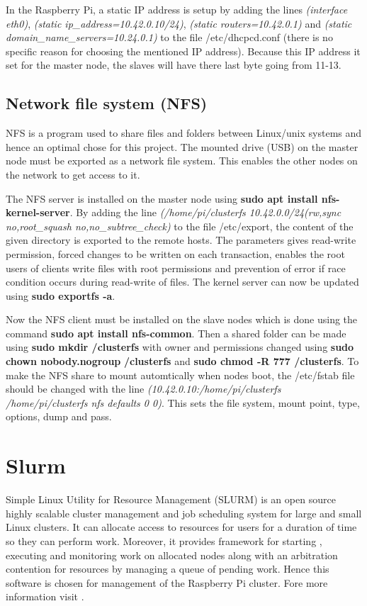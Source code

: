 \documentclass[../Head/Report.tex]{subfiles}
\begin{document}
In the Raspberry Pi, a static IP address is setup by adding the lines \textit{(interface eth0)}, \textit{(static ip\_address=10.42.0.10/24)}, \textit{(static routers=10.42.0.1)} and \textit{(static domain\_name\_servers=10.24.0.1)} to the file /etc/dhcpcd.conf (there is no specific reason for choosing the mentioned IP address). Because this IP address it set for the master node, the slaves will have there last byte going from 11-13.

\subsection{Network file system (NFS)} 

NFS is a program used to share files and folders between Linux/unix systems and hence an optimal chose for this project. The mounted drive (USB) on the master node must be exported as a network file system. This enables the other nodes on the network to get access to it. 

The NFS server is installed on the master node using \textbf{sudo apt install nfs-kernel-server}. By adding the line \textit{(/home/pi/clusterfs 10.42.0.0/24(rw,sync no,root\_squash no,no\_subtree\_check)} to the file /etc/export, the content of the given directory is exported to the remote hosts. The parameters gives read-write permission, forced changes to be written on each transaction, enables the root users of clients write files with root permissions and prevention of error if race condition occurs during read-write of files. The kernel server can now be updated using \textbf{sudo exportfs -a}. 

Now the NFS client must be installed on the slave nodes which is done using the command \textbf{sudo apt install nfs-common}. Then a shared folder can be made using \textbf{sudo mkdir /clusterfs} with owner and permissions changed using \textbf{sudo chown nobody.nogroup} \textbf{/clusterfs} and \textbf{sudo chmod -R 777 /clusterfs}. To make the NFS share to mount automtically when nodes boot, the /etc/fstab file should be changed with the line \textit{(10.42.0.10:/home/pi/clusterfs /home/pi/clusterfs nfs defaults 0 0)}. This sets the file system, mount point, type, options, dump and pass. \cite{NFS}

\section{Slurm}

Simple Linux Utility for Resource Management (SLURM) is an open source highly scalable cluster management and job scheduling system for large and small Linux clusters. It can allocate access to resources for users for a duration of time so they can perform work. Moreover, it provides framework for starting , executing and monitoring work on allocated nodes along with an arbitration contention for resources by managing a queue of pending work. Hence this software is chosen for management of the Raspberry Pi cluster. Fore more information visit \cite{SLURM}. 
\end{document}

